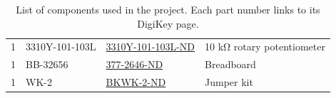 \documentclass[11pt]{article}
\begin{document}
\begin{table}[H]
\begin{tabular}{|c|l|l|l|}
        1 & 3310Y-101-103L & \href{https://www.digikey.com/en/products/detail/bourns-inc/3310Y-101-103L/2534073}{3310Y-101-103L-ND} & 10 \si{\kilo\ohm} rotary potentiometer\\
        1 & BB-32656 &  \href{https://www.digikey.com/en/products/detail/bud-industries/BB-32656/8602381}{377-2646-ND} & Breadboard \\
        1 & WK-2 & \href{https://www.digikey.com/en/products/detail/global-specialties/WK-2/5231341}{BKWK-2-ND} & Jumper kit\\
        \hline
    \end{tabular}
    \caption{List of components used in the project. Each part number links to its DigiKey page.}
    \label{tab:parts_list}
\end{table}
\end{document}
